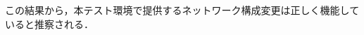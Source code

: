 \documentclass[submit,techrep]{ipsj}
\begin{document}
この結果から，本テスト環境で提供するネットワーク構成変更は正しく機能していると推察される．


\end{document}
